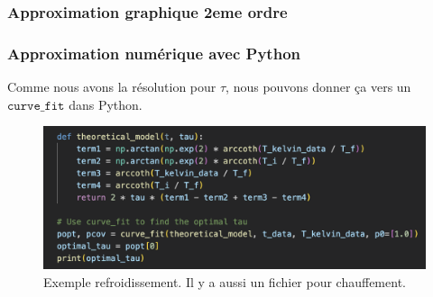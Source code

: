 \documentclass{beamer}
\begin{document}
\begin{frame}
\frametitle{Approximation graphique 2eme ordre}


\end{frame}




\begin{frame}
\frametitle{Approximation numérique avec Python}
Comme nous avons la résolution pour $\tau$, nous pouvons donner ça vers un $\texttt{curve\_fit}$ dans Python.

\begin{figure}
\includegraphics[width=\textwidth]{Fig/Python_Refroid.png}
\caption{Exemple refroidissement. Il y a aussi un fichier pour chauffement.}
\end{figure}

\end{frame}
\end{document}
